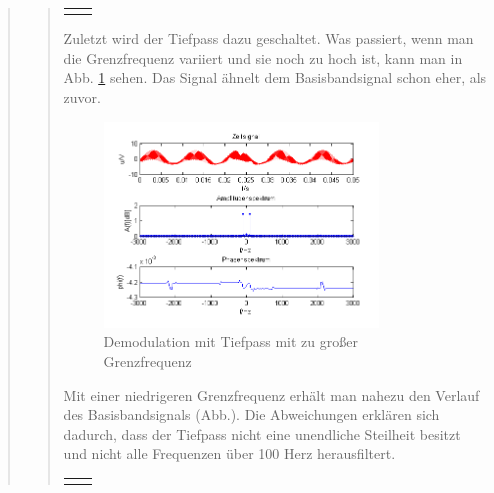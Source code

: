 \begin{quote}
\begin{quote}
\begin{center}
\begin{tabular}{ll}
\begin{minipage}{0.67\textwidth}
            \end{minipage}
        
        \end{tabular}
        \end{center}
               
        Zuletzt wird der Tiefpass dazu geschaltet. Was passiert, wenn man die
        Grenzfrequenz variiert und sie noch zu hoch ist, kann man in Abb.
        \ref{fig:TPmitzugrosserGF} sehen. Das Signal ähnelt dem Basisbandsignal
        schon eher, als zuvor.
        
        \begin{figure}[H]
		\begin{center}
			\includegraphics[width=0.8\textwidth]{Bilder/Demo_Sin_2k_100Hz_mo_mitTiefpasszugrosseGrenzfrequenz}
		\end{center}
		\caption{Demodulation mit Tiefpass mit zu großer Grenzfrequenz}
		\label{fig:TPmitzugrosserGF}
	    \end{figure}
	    
	    Mit einer niedrigeren Grenzfrequenz erhält man nahezu den Verlauf des
	    Basisbandsignals (Abb.). Die Abweichungen erklären sich dadurch, dass der
	    Tiefpass nicht eine unendliche Steilheit besitzt und nicht alle Frequenzen
	    über 100 Herz herausfiltert.
	    
	    \begin{center}
        \begin{tabular}{ll}
        
        \hspace{-5cm}
            \begin{minipage}{0.67\textwidth}
                

\end{minipage}
\end{tabular}
\end{center}
\end{quote}
\end{quote}
